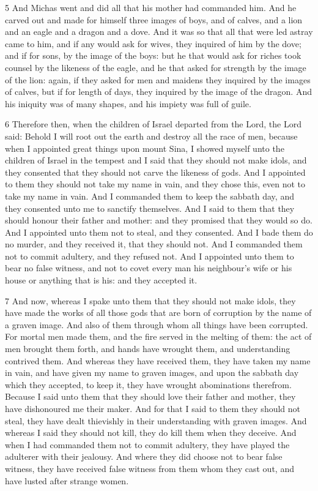 \par 5 And Michas went and did all that his mother had commanded him. And he carved out and made for himself three images of boys, and of calves, and a lion and an eagle and a dragon and a dove. And it was so that all that were led astray came to him, and if any would ask for wives, they inquired of him by the dove; and if for sons, by the image of the boys: but he that would ask for riches took counsel by the likeness of the eagle, and he that asked for strength by the image of the lion: again, if they asked for men and maidens they inquired by the images of calves, but if for length of days, they inquired by the image of the dragon. And his iniquity was of many shapes, and his impiety was full of guile. 

\par 6 Therefore then, when the children of Israel departed from the Lord, the Lord said: Behold I will root out the earth and destroy all the race of men, because when I appointed great things upon mount Sina, I showed myself unto the children of Israel in the tempest and I said that they should not make idols, and they consented that they should not carve the likeness of gods. And I appointed to them they should not take my name in vain, and they chose this, even not to take my name in vain. And I commanded them to keep the sabbath day, and they consented unto me to sanctify themselves. And I said to them that they should honour their father and mother: and they promised that they would so do. And I appointed unto them not to steal, and they consented. And I bade them do no murder, and they received it, that they should not. And I commanded them not to commit adultery, and they refused not. And I appointed unto them to bear no false witness, and not to covet every man his neighbour's wife or his house or anything that is his: and they accepted it. 

\par 7 And now, whereas I spake unto them that they should not make idols, they have made the works of all those gods that are born of corruption by the name of a graven image. And also of them through whom all things have been corrupted. For mortal men made them, and the fire served in the melting of them: the act of men brought them forth, and hands have wrought them, and understanding contrived them. And whereas they have received them, they have taken my name in vain, and have given my name to graven images, and upon the sabbath day which they accepted, to keep it, they have wrought abominations therefrom. Because I said unto them that they should love their father and mother, they have dishonoured me their maker. And for that I said to them they should not steal, they have dealt thievishly in their understanding with graven images. And whereas I said they should not kill, they do kill them when they deceive. And when I had commanded them not to commit adultery, they have played the adulterer with their jealousy. And where they did choose not to bear false witness, they have received false witness from them whom they cast out, and have lusted after strange women. 

